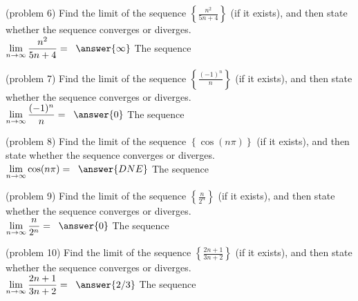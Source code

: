 \documentclass[handout]{ximera}
\begin{document}
\begin{problem}(problem 6)
Find the limit of the sequence $\displaystyle \left\{\frac{n^2}{5n+4}\right\}$ (if it exists), and then state whether the sequence converges or diverges.\\
$\displaystyle \lim_{n\to \infty} \frac{n^2}{5n+4} = \;\;\answer{\infty}$ \quad
The sequence 
\end{problem}

\begin{problem}(problem 7)
Find the limit of the sequence $\displaystyle \left\{\frac{(-1)^n}{n}\right\}$ (if it exists), and then state whether the sequence converges or diverges.\\
$\displaystyle \lim_{n\to \infty} \frac{(-1)^n}{n} = \;\;\answer{0}$ \quad
The sequence 
\end{problem}


\begin{problem}(problem 8)
Find the limit of the sequence $\displaystyle \left\{\cos(n\pi)\right\}$ (if it exists), and then state whether the sequence converges or diverges.\\
$\displaystyle \lim_{n\to \infty} \cos(n\pi) = \;\;\answer{DNE}$ \quad
The sequence 
\end{problem}


\begin{problem}(problem 9)
Find the limit of the sequence $\displaystyle \left\{\frac{n}{2^n}\right\}$ (if it exists), and then state whether the sequence converges or diverges.\\
$\displaystyle \lim_{n\to \infty} \frac{n}{2^n} = \;\;\answer{0}$ \quad
The sequence 
\end{problem}


\begin{problem}(problem 10)
Find the limit of the sequence $\displaystyle \left\{\frac{2n+1}{3n+2}\right\}$ (if it exists), and then state whether the sequence converges or diverges.\\
$\displaystyle \lim_{n\to \infty} \frac{2n+1}{3n+2} = \;\;\answer{2/3}$ \quad
The sequence 
\end{problem}
\end{document}
